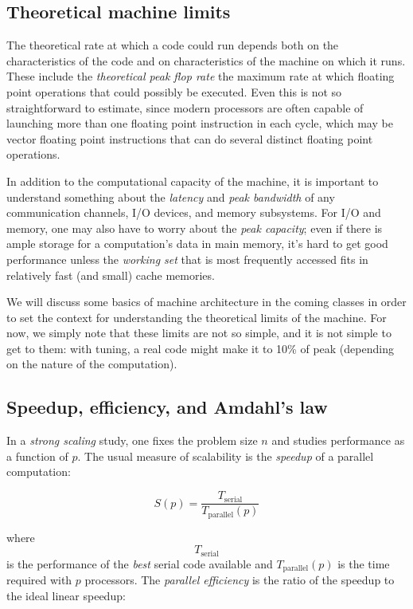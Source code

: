 \documentclass[12pt, leqno]{article} %
\begin{document}
\subsection{Theoretical machine limits}

The theoretical rate at which a code could run depends both on the
characteristics of the code and on characteristics of the machine on
which it runs. These include the \emph{theoretical peak flop rate} the
maximum rate at which floating point operations that could possibly be
executed. Even this is not so straightforward to estimate, since modern
processors are often capable of launching more than one floating point
instruction in each cycle, which may be vector floating point
instructions that can do several distinct floating point operations.

In addition to the computational capacity of the machine, it is
important to understand something about the \emph{latency} and
\emph{peak bandwidth} of any communication channels, I/O devices, and
memory subsystems. For I/O and memory, one may also have to worry about
the \emph{peak capacity}; even if there is ample storage for a
computation's data in main memory, it's hard to get good performance
unless the \emph{working set} that is most frequently accessed fits in
relatively fast (and small) cache memories.

We will discuss some basics of machine architecture in the coming
classes in order to set the context for understanding the theoretical
limits of the machine. For now, we simply note that these limits are not
so simple, and it is not simple to get to them: with tuning, a real code
might make it to 10\% of peak (depending on the nature of the
computation).

\subsection{Speedup, efficiency, and Amdahl's law}

In a \emph{strong scaling} study, one fixes the problem size $n$ and
studies performance as a function of $p$. The usual measure of
scalability is the \emph{speedup} of a parallel computation:

\[
  S(p) = \frac{T_{\mathrm{serial}}}{T_{\mathrm{parallel}}(p)}
\]

where \[T_{\mathrm{serial}}\] is the performance of the \emph{best}
serial code available and $T_{\mathrm{parallel}}(p)$ is the time
required with $p$ processors. The \emph{parallel efficiency} is the
ratio of the speedup to the ideal linear speedup:
\end{document}
